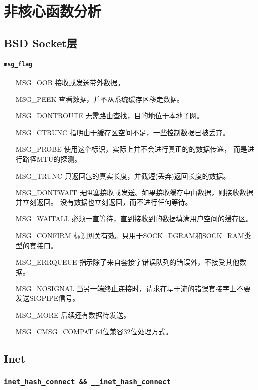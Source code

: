 \chapter{非核心函数分析}

\minitoc

	\section{BSD Socket层}
		\subsubsection{\texttt{msg_flag}}
\begin{enumerate}
\item[MSG\_OOB]			接收或发送带外数据。
\item[MSG\_PEEK]		查看数据，并不从系统缓存区移走数据。
\item[MSG\_DONTROUTE]	无需路由查找，目的地位于本地子网。
\item[MSG\_CTRUNC]		指明由于缓存区空间不足，一些控制数据已被丢弃。
\item[MSG\_PROBE]		使用这个标识，实际上并不会进行真正的的数据传递，
						而是进行路径MTU的探测。
\item[MSG\_TRUNC]		只返回包的真实长度，并截短(丢弃)返回长度的数据。
\item[MSG\_DONTWAIT]	无阻塞接收或发送。如果接收缓存中由数据，则接收数据并立刻返回。
						没有数据也立刻返回，而不进行任何等待。
\item[MSG\_WAITALL]		必须一直等待，直到接收到的数据填满用户空间的缓存区。
\item[MSG\_CONFIRM]		标识网关有效。只用于SOCK\_DGRAM和SOCK\_RAM类型的套接口。
\item[MSG\_ERRQUEUE]	指示除了来自套接字错误队列的错误外，不接受其他数据。
\item[MSG\_NOSIGNAL]	当另一端终止连接时，请求在基于流的错误套接字上不要发送SIGPIPE信号。
\item[MSG\_MORE]		后续还有数据待发送。
\item[MSG\_CMSG\_COMPAT]64位兼容32位处理方式。
\end{enumerate}

	\section{Inet}
    	\subsection{\texttt{inet_hash_connect && __inet_hash_connect}}

